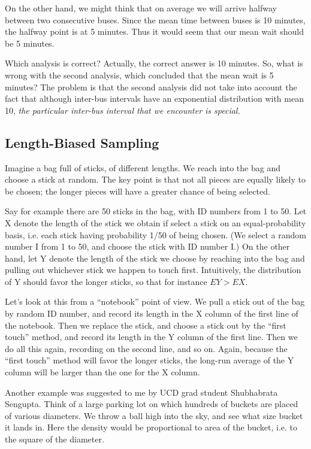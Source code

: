 On the other hand, we might think that on average we will arrive halfway
between two consecutive buses. Since the mean time between buses is 10
minutes, the halfway point is at 5 minutes. Thus it would seem that our
mean wait should be 5 minutes.

Which analysis is correct? Actually, the correct answer is 10 minutes.
So, what is wrong with the second analysis, which concluded that the
mean wait is 5 minutes?  The problem is that the second analysis did not
take into account the fact that although inter-bus intervals have an
exponential distribution with mean 10, \textit{the particular inter-bus
interval that we encounter is special.}

\subsection{Length-Biased Sampling}
\label{lbsamp}

Imagine a bag full of sticks, of different lengths. We reach into the
bag and choose a stick at random. The key point is that not all pieces
are equally likely to be chosen; the longer pieces will have a greater
chance of being selected.

Say for example there are 50 sticks in the bag, with ID numbers from 1
to 50.  Let X denote the length of the stick we obtain if select a stick
on an equal-probability basis, i.e. each stick having probability 1/50
of being chosen.  (We select a random number I from 1 to 50, and choose
the stick with ID number I.)  On the other hand, let Y denote the length
of the stick we choose by reaching into the bag and pulling out
whichever stick we happen to touch first.  Intuitively, the distribution
of Y should favor the longer sticks, so that for instance $EY > EX$.

Let's look at this from a ``notebook'' point of view.  We pull a stick
out of the bag by random ID number, and record its length in the X
column of the first line of the notebook.  Then we replace the stick,
and choose a stick out by the ``first touch'' method, and record its
length in the Y column of the first line.  Then we do all this again,
recording on the second line, and so on.  Again, because the ``first
touch'' method will favor the longer sticks, the long-run average of the
Y column will be larger than the one for the X column.


Another example was suggested to me by UCD grad student Shubhabrata
Sengupta.  Think of a large parking lot on which hundreds of buckets are
placed of various diameters.  We throw a ball high into the sky, and see
what size bucket it lands in.  Here the density would be proportional to
area of the bucket, i.e. to the square of the diameter. 

